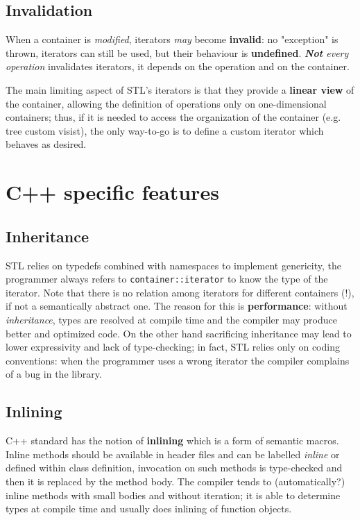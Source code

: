 \subsection{Invalidation}
When a container is \textit{modified},
iterators \textit{may} become \textbf{invalid}:
no "exception" is thrown,
iterators can still be used,
but their behaviour is \textbf{undefined}.
\textit{\textbf{Not} every operation} invalidates iterators,
it depends on the operation and on the container.\nl

The main limiting aspect of STL's iterators is that they provide a \textbf{linear view} of the container,
allowing the definition of operations only on one-dimensional containers;
thus, if it is needed to access the organization of the container (e.g. tree custom visist), the only way-to-go is to define a custom iterator which behaves as desired.

\section{C++ specific features}

\subsection{Inheritance}
STL relies on typedefs combined with namespaces to
implement genericity, the programmer always refers to \lstinline|container::iterator| to know the type of the iterator.
Note that there is no relation among iterators for different containers (!), if not a semantically abstract one.
The reason for this is \textbf{performance}: 
without \textit{inheritance}, types are resolved at compile time and the compiler may produce better and optimized code.
On the other hand sacrificing inheritance may lead to
lower expressivity and lack of type-checking;
in fact, STL relies only on coding conventions:
when the programmer uses a wrong iterator the compiler complains of a bug in the library.

\subsection{Inlining}
C++ standard has the notion of \textbf{inlining} which is a form of semantic macros.
Inline methods should be available in header files
and can be labelled \textit{inline} or defined within class
definition, invocation on such methods is type-checked and then it is
replaced by the method body.
The compiler tends to (automatically?)
inline methods with small bodies and without iteration; 
it is able to determine types at compile
time and usually does inlining of function objects.

